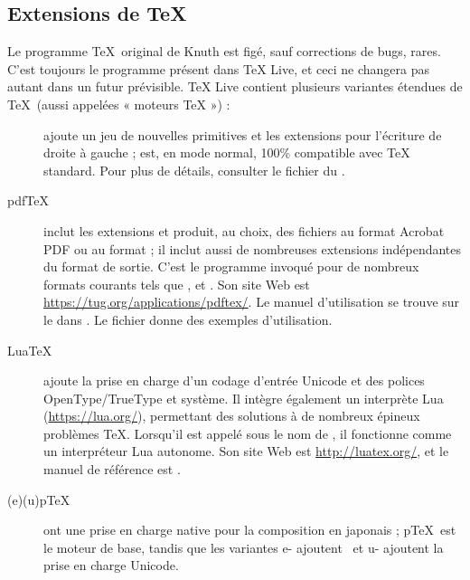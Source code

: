 \documentclass[german, english, french, 12pt]{article}
\renewcommand{\TL}{\TeX{} Live\xspace}%
\begin{document}
\subsection{Extensions de \protect\TeX}
\label{sec:tex-extensions}

Le programme \TeX\ original de Knuth est figé, sauf corrections de bugs,
rares. C'est toujours le programme  présent dans \TL, et ceci ne
changera pas autant dans un futur prévisible. \TL contient plusieurs variantes
étendues de \TeX\ (aussi appelées « moteurs \TeX{} ») :

\begin{description}

\item [\eTeX{}] \label{text:etex} ajoute un jeu de nouvelles primitives et les
  extensions \TeXXeT{} pour l'écriture de droite à gauche ; \eTeX{} est, en mode
  normal, 100\% compatible avec \TeX{} standard.  Pour plus de détails, consulter
  le fichier  du \DVD{}.

\item[pdf\TeX{}] inclut les extensions \eTeX{} et produit, au choix, des
  fichiers au format Acrobat PDF ou au format \dvi{} ; il inclut aussi de
  nombreuses extensions indépendantes du format de sortie. C'est le programme
  invoqué pour de nombreux formats courants tels que , 
  et . Son site Web est
  \url{https://tug.org/applications/pdftex/}.  Le manuel d'utilisation se trouve
  sur le \DVD{} dans . Le
  fichier  donne des
  exemples d'utilisation.

\item[Lua\TeX] ajoute la prise en charge d'un codage d'entrée Unicode et des
  polices OpenType/TrueType et système. Il intègre également un interprète Lua
  (\url{https://lua.org/}), permettant des solutions à de nombreux épineux
problèmes \TeX{}. Lorsqu'il est appelé sous le nom de , il
fonctionne comme un interpréteur Lua autonome. Son site Web est
\url{http://luatex.org/}, et le manuel de référence est
.

\item[(e)(u)p\TeX] ont une prise en charge native pour la composition en
  japonais ; p\TeX\ est le moteur de base, tandis que les variantes e- ajoutent
  \eTeX\ et u- ajoutent la prise en charge Unicode.


\end{description}
\end{document}
